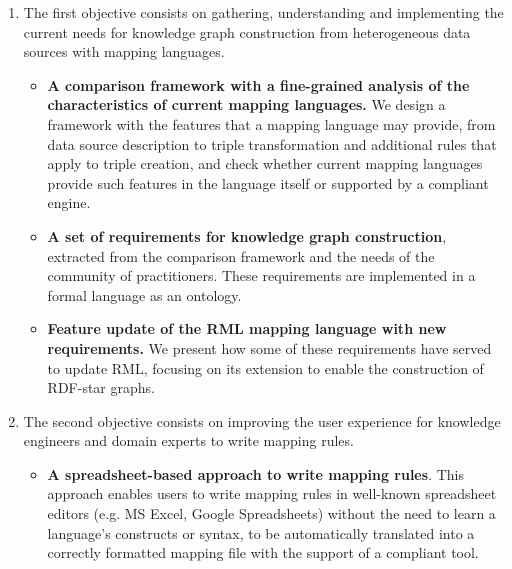\begin{enumerate}
    \item The first objective consists on gathering, understanding and implementing the current needs for knowledge graph construction from heterogeneous data sources with mapping languages. 

    \begin{itemize}
        \item \textbf{A comparison framework with a fine-grained analysis of the characteristics of current mapping languages.} We design a framework with the features that a mapping language may provide, from data source description to triple transformation and additional rules that apply to triple creation, and check whether current mapping languages provide such features in the language itself or supported by a compliant engine. 

        \item \textbf{A set of requirements for knowledge graph construction}, extracted from the comparison framework and the needs of the community of practitioners. These requirements are implemented in a formal language as an ontology. 

        \item \textbf{Feature update of the RML mapping language with new requirements.} We present how some of these requirements have served to update RML, focusing on its extension to enable the construction of RDF-star graphs.
        
    \end{itemize}

    \item The second objective consists on improving the user experience for knowledge engineers and domain experts to write mapping rules.

    \begin{itemize}
        \item \textbf{A spreadsheet-based approach to write mapping rules}. This approach enables users to write mapping rules in well-known spreadsheet editors (e.g. MS Excel, Google Spreadsheets) without the need to learn a language's constructs or syntax, to be automatically translated into a correctly formatted mapping file with the support of a compliant tool. 


\end{itemize}
\end{enumerate}
